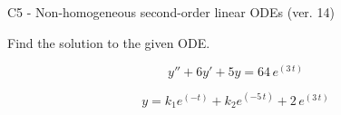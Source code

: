\begin{exercise}
  \begin{exerciseTitle}C5 - Non-homogeneous second-order linear ODEs (ver. 14)\end{exerciseTitle}
  \begin{exerciseStatement}
    
Find the solution to the given ODE.

    
\[y''+6y'+5y = 64 \, e^{\left(3 \, t\right)}\]

  \end{exerciseStatement}
  \begin{exerciseAnswer}
    
\[y= k_{1} e^{\left(-t\right)} + k_{2} e^{\left(-5 \, t\right)} + 2 \, e^{\left(3 \, t\right)}\]

  \end{exerciseAnswer}
\end{exercise}